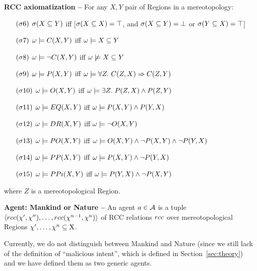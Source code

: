 \begin{definition}{\bf RCC axiomatization --}
	For any $X,Y$ pair of Regions in a mereotopology:
	\begin{itemize}[noitemsep]
	\item[$(\sigma6)$] $\sigma(X\subseteq Y)$ iff [$\sigma(X\subseteq X)=\top$, and $\sigma(X\subseteq Y)=\bot$ or $\sigma(Y\subseteq X)=\top$]
	\item[$(\sigma7)$] $\omega\models C(X,Y)$ iff $\omega\models X\subseteq Y$ 
	\item[$(\sigma8)$] $\omega\models\neg C(X,Y)$ iff  $\omega\not\models X\subseteq Y$
	\item[$(\sigma9)$] $\omega\models P(X,Y)$ iff $\omega\models\forall Z.~C(Z,X)\Rightarrow C(Z,Y)$
	\item[$(\sigma10)$] $\omega\models O(X,Y)$ iff $\omega\models\exists Z.~P(Z,X)\wedge P(Z,Y)$
	\item[$(\sigma11)$] $\omega\models EQ(X,Y)$ iff $\omega\models P(X,Y)\wedge P(Y,X)$
	\item[$(\sigma12)$] $\omega\models DR(X,Y)$ iff $\omega\models\neg O(X,Y)$
	\item[$(\sigma13)$] $\omega\models PO(X,Y)$ iff $\omega\models O(X,Y)\wedge\neg P(X,Y)\wedge\neg P(Y,X)$
	\item[$(\sigma14)$] $\omega\models PP(X,Y)$ iff $\omega\models P(X,Y)\wedge\neg P(Y,X)$
	\item[$(\sigma15)$] $\omega\models PPi(X,Y)$ iff $\omega\models P(Y,X)\wedge\neg P(X,Y)$
\end{itemize}
where $Z$ is a mereotopological Region.
\end{definition}

\begin{definition}{\bf Agent: Mankind or Nature --}\label{def:agent}
	An agent $a\in\mathcal{A}$ is a tuple
	$\langle rcc(\chi',\chi''),\ldots,rcc(\chi^{n-1},\chi^n)\rangle$
	of RCC relations $rcc$ over mereotopological Regions
	${\chi',\ldots,\chi^n}\subseteq\mathrm{X}$. 
\end{definition}

Currently, we do not distinguish between Mankind and Nature (since we still
lack of the definition of ``malicious intent'', which is defined in
Section~\ref{sec:theory}) and we have defined them as two generic
agents.


